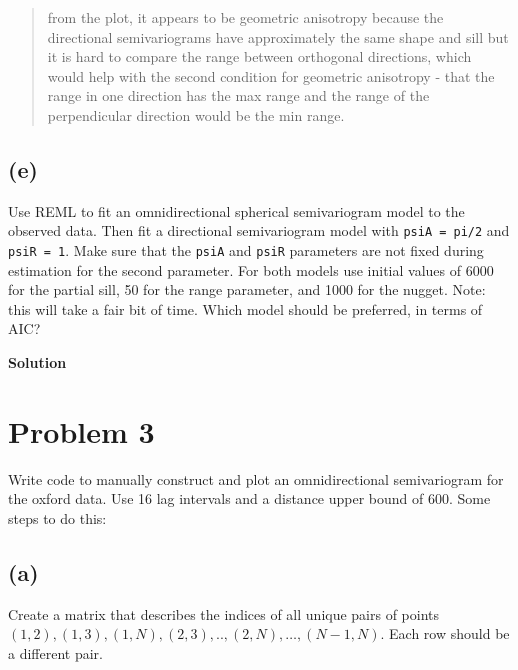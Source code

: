 \documentclass[
  letterpaper,
  DIV=11,
  numbers=noendperiod]{scrartcl}
\begin{document}
\begin{quote}
from the plot, it appears to be geometric anisotropy because the
directional semivariograms have approximately the same shape and sill
but it is hard to compare the range between orthogonal directions, which
would help with the second condition for geometric anisotropy - that the
range in one direction has the max range and the range of the
perpendicular direction would be the min range.
\end{quote}

\hypertarget{e}{%
\subsection{(e)}\label{e}}

Use REML to fit an omnidirectional spherical semivariogram model to the
observed data. Then fit a directional semivariogram model with
\texttt{psiA\ =\ pi/2} and \texttt{psiR\ =\ 1}. Make sure that the
\texttt{psiA} and \texttt{psiR} parameters are not fixed during
estimation for the second parameter. For both models use initial values
of 6000 for the partial sill, 50 for the range parameter, and 1000 for
the nugget. Note: this will take a fair bit of time. Which model should
be preferred, in terms of AIC?

\textbf{Solution}

\hypertarget{problem-3}{%
\section{Problem 3}\label{problem-3}}

Write code to manually construct and plot an omnidirectional
semivariogram for the oxford data. Use 16 lag intervals and a distance
upper bound of 600. Some steps to do this:

\hypertarget{a-2}{%
\subsection{(a)}\label{a-2}}

Create a matrix that describes the indices of all unique pairs of points
\((1, 2), (1, 3), (1, N), (2, 3), .., (2, N), \ldots, (N-1, N)\). Each
row should be a different pair.
\end{document}
